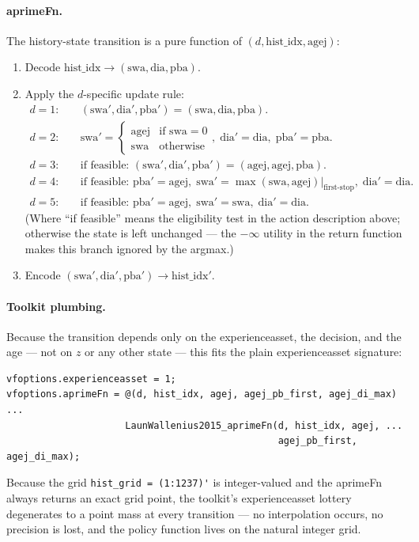 \paragraph{aprimeFn.} The history-state transition is a pure function of $(d, \text{hist\_idx}, \text{agej})$:
\begin{enumerate}
 \item Decode $\text{hist\_idx} \to (\text{swa}, \text{dia}, \text{pba})$.
 \item Apply the $d$-specific update rule:
\begin{align*}
 d=1: &\quad (\text{swa}', \text{dia}', \text{pba}') = (\text{swa}, \text{dia}, \text{pba}). \\
 d=2: &\quad \text{swa}' = \begin{cases}\text{agej} & \text{if swa}=0 \\ \text{swa} & \text{otherwise}\end{cases},\; \text{dia}'=\text{dia},\; \text{pba}'=\text{pba}.\\
 d=3: &\quad \text{if feasible: } (\text{swa}', \text{dia}', \text{pba}') = (\text{agej}, \text{agej}, \text{pba}). \\
 d=4: &\quad \text{if feasible: } \text{pba}' = \text{agej},\; \text{swa}' = \max(\text{swa}, \text{agej})|_{\text{first-stop}},\; \text{dia}'=\text{dia}. \\
 d=5: &\quad \text{if feasible: } \text{pba}' = \text{agej},\; \text{swa}' = \text{swa},\; \text{dia}'=\text{dia}.
\end{align*}
 (Where ``if feasible'' means the eligibility test in the action description above; otherwise the state is left unchanged --- the $-\infty$ utility in the return function makes this branch ignored by the argmax.)
 \item Encode $(\text{swa}', \text{dia}', \text{pba}') \to \text{hist\_idx}'$.
\end{enumerate}

\paragraph{Toolkit plumbing.} Because the transition depends only on the experienceasset, the decision, and the age --- not on $z$ or any other state --- this fits the plain experienceasset signature:
\begin{verbatim}
vfoptions.experienceasset = 1;
vfoptions.aprimeFn = @(d, hist_idx, agej, agej_pb_first, agej_di_max) ...
                     LaunWallenius2015_aprimeFn(d, hist_idx, agej, ...
                                                agej_pb_first, agej_di_max);
\end{verbatim}
Because the grid \verb|hist_grid = (1:1237)'| is integer-valued and the aprimeFn always returns an exact grid point, the toolkit's experienceasset lottery degenerates to a point mass at every transition --- no interpolation occurs, no precision is lost, and the policy function lives on the natural integer grid.

